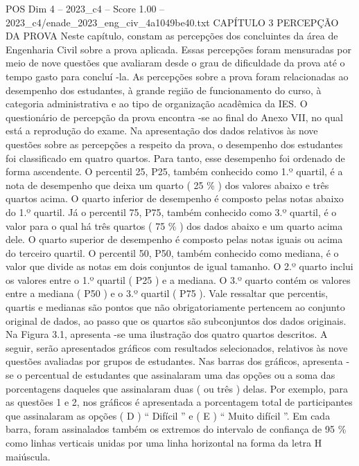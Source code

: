 \begin{textsample}{POS Dim 4 – 2023\_c4 – Score 1.00 – 2023\_c4/enade\_2023\_eng\_civ\_4a1049be40.txt}  \label{ex:f4_pos_176}
CAPÍTULO 3 PERCEPÇÃO DA PROVA Neste capítulo, constam as percepções dos concluintes da área de Engenharia Civil sobre a prova aplicada.
Essas percepções foram mensuradas por meio de nove questões que avaliaram desde o grau de dificuldade da prova até o tempo gasto para concluí -la.
As percepções sobre a prova foram relacionadas ao desempenho dos estudantes, à grande região de funcionamento do curso, à categoria administrativa e ao tipo de organização acadêmica da IES.
O questionário de percepção da prova encontra -se ao final do Anexo VII, no qual está a reprodução do exame.
Na apresentação dos dados relativos às nove questões sobre as percepções a respeito da prova, o desempenho dos estudantes foi classificado em quatro quartos.
Para tanto, esse desempenho foi ordenado de forma ascendente.
O percentil 25, P25, também conhecido como 1.º quartil, é a nota de desempenho que deixa um quarto ( 25 \% ) dos valores abaixo e três quartos acima.
O quarto inferior de desempenho é composto pelas notas abaixo do 1.º quartil.
Já o percentil 75, P75, também conhecido como 3.º quartil, é o valor para o qual há três quartos ( 75 \% ) dos dados abaixo e um quarto acima dele.
O quarto superior de desempenho é composto pelas notas iguais ou acima do terceiro quartil.
O percentil 50, P50, também conhecido como mediana, é o valor que divide as notas em dois conjuntos de igual tamanho.
O 2.º quarto inclui os valores entre o 1.º quartil ( P25 ) e a mediana.
O 3.º quarto contém os valores entre a mediana ( P50 ) e o 3.º quartil ( P75 ).
Vale ressaltar que percentis, quartis e medianas são pontos que não obrigatoriamente pertencem ao conjunto original de dados, ao passo que os quartos são subconjuntos dos dados originais.
Na Figura 3.1, apresenta -se uma ilustração dos quatro quartos descritos.
A seguir, serão apresentados gráficos com resultados selecionados, relativos às nove questões avaliadas por grupos de estudantes.
Nas barras dos gráficos, apresenta -se o percentual de estudantes que assinalaram uma das opções ou a soma das porcentagens daqueles que assinalaram duas ( ou três ) delas.
Por exemplo, para as questões 1 e 2, nos gráficos é apresentada a porcentagem total de participantes que assinalaram as opções ( D ) “ Difícil ” e ( E ) “ Muito difícil ”.
Em cada barra, foram assinalados também os extremos do intervalo de confiança de 95 \% como linhas verticais unidas por uma linha horizontal na forma da letra H maiúscula.

\end{textsample}
